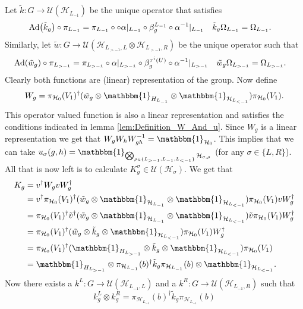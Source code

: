 \documentclass[12pt,a4paper,twoside]{article}
\let\originalleft\left
\let\originalright\right
\renewcommand{\left}{\mathopen{}\mathclose\bgroup\originalleft}
\renewcommand{\right}{\aftergroup\egroup\originalright}
\newcommand{\UU}{\mathcal U}
\newcommand{\HH}{\mathcal H}
\newcommand{\id}{\mathbbm{1}}
\newcommand{\Ad}[1]{\textrm{Ad}\left(#1\right)}
\theoremstyle{definition}
\numberwithin{equation}{section}
\begin{document}
Let $\tilde k:G\rightarrow \UU(\HH_{L_{-1}})$ be the unique operator that satisfies
\begin{align}
	\Ad{\tilde{k}_g}\circ\pi_{L_{-1}}&=\pi_{L_{-1}}\circ \circ\alpha|_{L_{-1}}\circ\beta_g^{L_{-1}}\circ \alpha^{-1}|_{L_{-1}}&\tilde k_g\Omega_{L_{-1}}&=\Omega_{L_{-1}}.
\end{align}
Similarly, let $\tilde{w}:G\rightarrow\UU(\HH_{L_{>-1},L}\otimes\HH_{L_{>-1},R})$ be the unique operator such that
\begin{align}
	\Ad{\tilde w_{g}}\circ\pi_{L_{>-1}}&=\pi_{L_{>-1}}\circ\alpha|_{L_{>-1}}\circ\beta_g^{\tau^{i}(U)}\circ \alpha^{-1}|_{L_{>-1}}&\tilde w_{g}\Omega_{L_{>-1}}&=\Omega_{L_{>-1}}.
\end{align}
Clearly both functions are (linear) representation of the group. Now define
\begin{equation}
	W_g=\pi_{\HH_0}(V_1)^{\dagger}(\tilde{w}_g\otimes\id_{H_{L_{-1}}}\otimes\id_{\HH_{L_{<-1}}}) \pi_{\HH_0}(V_1).
\end{equation}
This operator valued function is also a linear representation and satisfies the conditions indicated in lemma \ref{lem:Definition_W_And_u}. Since $W_g$ is a linear representation we get that $W_gW_hW_{gh}^{-1}=\id_{\HH_0}$. This implies that we can take $u_\sigma(g,h)=\id_{\bigotimes_{\rho\in\{L_{>-1},L_{-1},L_{<-1}\}}\HH_{\sigma,\rho}}$ (for any $\sigma\in\{L,R\}$). All that is now left is to calculate $K^\sigma_g\in\UU(\HH_\sigma)$. We get that
\begin{align}
	K_g&=v^\dagger W_g v W_g^\dagger\\
	&=v^\dagger \pi_{\HH_0}(V_1)^{\dagger}(\tilde{w}_g\otimes\id_{\HH_{L_{-1}}}\otimes\id_{\HH_{L_{<-1}}}) \pi_{\HH_0}(V_1) v W_g^\dagger\\
	&=\pi_{\HH_0}(V_1)^{\dagger}\tilde v^\dagger(\tilde{w}_g\otimes\id_{\HH_{L_{-1}}}\otimes\id_{\HH_{L_{<-1}}}) \tilde v \pi_{\HH_0}(V_1) W_g^\dagger\\
	&=\pi_{\HH_0}(V_1)^{\dagger}(\tilde{w}_g\otimes\tilde{k}_g\otimes\id_{\HH_{L_{<-1}}}) \pi_{\HH_0}(V_1) W_g^\dagger\\
	&=\pi_{\HH_0}(V_1)^{\dagger}(\id_{H_{L_{>-1}}}\otimes \tilde k_g \otimes\id_{\HH_{L_{<-1}}}) \pi_{\HH_0}(V_1)\\
	&=\id_{H_{L_{>-1}}}\otimes \pi_{\HH_{L_{-1}}}(b)^\dagger \tilde k_g \pi_{\HH_{L_{-1}}}(b) \otimes\id_{\HH_{L_{<-1}}} .
\end{align}
Now there exists a $k^L:G\rightarrow \UU(\HH_{L_{-1},L})$ and a $k^R:G\rightarrow \UU(\HH_{L_{-1},R})$ such that
\begin{equation}
	k^L_g\otimes k^R_g=\pi_{\HH_{L_{-1}}}(b)^\dagger \tilde k_g \pi_{\HH_{L_{-1}}}(b)
\end{equation}
\end{document}
